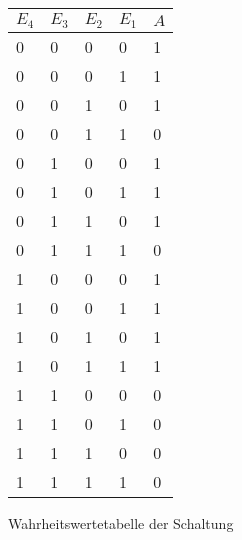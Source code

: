 \begin{wrapfigure}[22]{r}{.4\textwidth}
	\centering
	\begin{tabular}{|l|l|l|l|l|}
		\hline
		\textbf{$E_4$} & \textbf{$E_3$} & \textbf{$E_2$} & \textbf{$E_1$} & \textbf{$A$} \\ \hline\hline
		0             & 0             & 0             & 0             & 1          \\ \hline
		0             & 0             & 0             & 1             & 1          \\ \hline
		0             & 0             & 1             & 0             & 1          \\ \hline
		0             & 0             & 1             & 1             & 0          \\ \hline
		0             & 1             & 0             & 0             & 1          \\ \hline
		0             & 1             & 0             & 1             & 1          \\ \hline
		0             & 1             & 1             & 0             & 1          \\ \hline
		0             & 1             & 1             & 1             & 0          \\ \hline
		1             & 0             & 0             & 0             & 1          \\ \hline
		1             & 0             & 0             & 1             & 1          \\ \hline
		1             & 0             & 1             & 0             & 1          \\ \hline
		1             & 0             & 1             & 1             & 1          \\ \hline
		1             & 1             & 0             & 0             & 0          \\ \hline
		1             & 1             & 0             & 1             & 0          \\ \hline
		1             & 1             & 1             & 0             & 0          \\ \hline
		1             & 1             & 1             & 1             & 0          \\ \hline
	\end{tabular}
	\caption{Wahrheitswertetabelle der Schaltung}
	\label{table:task11.2}
\end{wrapfigure}

